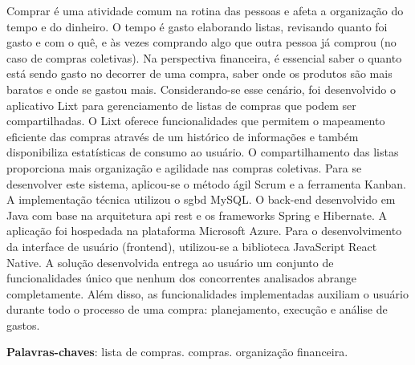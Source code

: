 
\setlength{\absparsep}{18pt} %
\begin{resumo}
 Comprar é uma atividade comum na rotina das pessoas e afeta a organização do tempo e do dinheiro. O tempo é gasto elaborando listas, revisando quanto foi gasto e com o quê, e às vezes comprando algo que outra pessoa já comprou (no caso de compras coletivas). Na perspectiva financeira, é essencial saber o quanto está sendo gasto no decorrer de uma compra, saber onde os produtos são mais baratos e onde se gastou mais. Considerando-se esse cenário, foi desenvolvido o aplicativo Lixt para gerenciamento de listas de compras que podem ser compartilhadas. O Lixt oferece funcionalidades que permitem o mapeamento eficiente das compras através de um histórico de informações e também disponibiliza estatísticas de consumo ao usuário. O compartilhamento das listas proporciona mais organização e agilidade nas compras coletivas. Para se desenvolver este sistema, aplicou-se o método ágil Scrum e a ferramenta Kanban. A implementação técnica utilizou o \gls{sgbd} MySQL. O back-end desenvolvido em Java com base na arquitetura \gls{api} \gls{rest} e os \glspl{framework} Spring e Hibernate. A aplicação foi hospedada na plataforma Microsoft Azure. Para o desenvolvimento da interface de usuário (\gls{frontend}), utilizou-se a biblioteca JavaScript React Native. A solução desenvolvida entrega ao usuário um conjunto de funcionalidades único que nenhum dos concorrentes analisados abrange completamente. Além disso, as funcionalidades implementadas auxiliam o usuário durante todo o processo de uma compra: planejamento, execução e análise de gastos.

 \textbf{Palavras-chaves}: lista de compras. compras. organização financeira.
\end{resumo}


